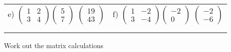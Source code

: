 \documentclass[fontsize=12pt]{scrartcl}
\begin{document}
\begin{tabular}{p{9cm}p{9cm}}
e) $\begin{pmatrix}1&2\\3&4 \end{pmatrix}\begin{pmatrix}5\\7 \end{pmatrix}$
 \quad $\begin{pmatrix}19\\43\end{pmatrix}$
&f) $\begin{pmatrix}1&-2\\3&-4 \end{pmatrix} \begin{pmatrix}-2\\0 \end{pmatrix}$
 \quad $\begin{pmatrix}-2\\-6 \end{pmatrix}$
\\\\\\
\end{tabular}
\newpage
Work out the matrix calculations
\newline
\newline
\end{document}
